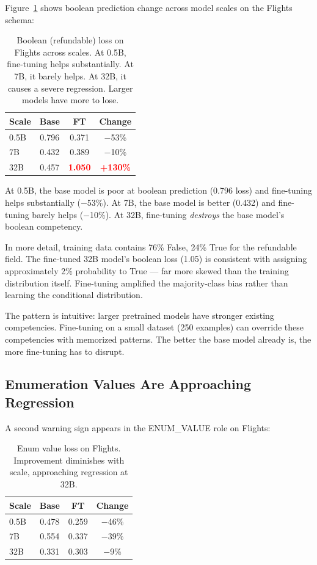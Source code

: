 \documentclass[11pt]{article}
\newcommand{\regress}[1]{\textcolor{red}{\textbf{#1}}}
\begin{document}
Figure~\ref{fig:scaling} shows boolean prediction change across model scales on the Flights schema:

\begin{table}[h]
\centering
\small
\begin{tabular}{lccc}
\toprule
\textbf{Scale} & \textbf{Base} & \textbf{FT} & \textbf{Change} \\
\midrule
0.5B & 0.796 & 0.371 & $-$53\% \\
7B   & 0.432 & 0.389 & $-$10\% \\
32B  & 0.457 & \regress{1.050} & \regress{+130\%} \\
\bottomrule
\end{tabular}
\caption{Boolean (refundable) loss on Flights across scales. At 0.5B, fine-tuning helps substantially. At 7B, it barely helps. At 32B, it causes a severe regression. Larger models have more to lose.}
\label{fig:scaling}
\end{table}

At 0.5B, the base model is poor at boolean prediction (0.796 loss) and fine-tuning helps substantially ($-$53\%). At 7B, the base model is better (0.432) and fine-tuning barely helps ($-$10\%). At 32B, fine-tuning \emph{destroys} the base model's boolean competency.

In more detail, training data contains 76\% False, 24\% True for the refundable field. The fine-tuned 32B model's boolean loss (1.05) is consistent with assigning approximately 2\% probability to True — far more skewed than the training distribution itself. Fine-tuning amplified the majority-class bias rather than learning the conditional distribution.

The pattern is intuitive: larger pretrained models have stronger existing competencies. Fine-tuning on a small dataset (250 examples) can override these competencies with memorized patterns. The better the base model already is, the more fine-tuning has to disrupt.

\subsection{Enumeration Values Are Approaching Regression}

A second warning sign appears in the ENUM\_VALUE role on Flights:

\begin{table}[h]
\centering
\small
\begin{tabular}{lccc}
\toprule
\textbf{Scale} & \textbf{Base} & \textbf{FT} & \textbf{Change} \\
\midrule
0.5B & 0.478 & 0.259 & $-$46\% \\
7B   & 0.554 & 0.337 & $-$39\% \\
32B  & 0.331 & 0.303 & $-$9\% \\
\bottomrule
\end{tabular}
\caption{Enum value loss on Flights. Improvement diminishes with scale, approaching regression at 32B.}
\label{tab:enum_trend}
\end{table}
\end{document}
